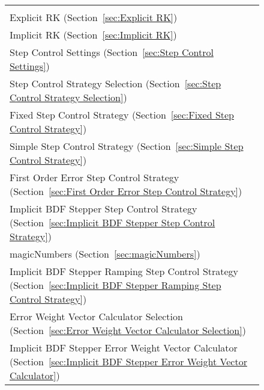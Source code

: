 \begin{figure}
\begin{tabular}{p{}}
    \index{Implicit BDF} \\ 
\hspace*{0.6in} Explicit RK (Section~\ref{sec:Explicit RK})
    \index{Explicit RK} \\ 
\hspace*{0.6in} Implicit RK (Section~\ref{sec:Implicit RK})
    \index{Implicit RK} \\ 
\hspace*{0.4in} Step Control Settings (Section~\ref{sec:Step Control Settings})
    \index{Step Control Settings} \\ 
\hspace*{0.6in} Step Control Strategy Selection (Section~\ref{sec:Step Control Strategy Selection})
    \index{Step Control Strategy Selection} \\ 
\hspace*{0.8in} Fixed Step Control Strategy (Section~\ref{sec:Fixed Step Control Strategy})
    \index{Fixed Step Control Strategy} \\ 
\hspace*{0.8in} Simple Step Control Strategy (Section~\ref{sec:Simple Step Control Strategy})
    \index{Simple Step Control Strategy} \\ 
\hspace*{0.8in} First Order Error Step Control Strategy (Section~\ref{sec:First Order Error Step Control Strategy})
    \index{First Order Error Step Control Strategy} \\ 
\hspace*{0.8in} Implicit BDF Stepper Step Control Strategy (Section~\ref{sec:Implicit BDF Stepper Step Control Strategy})
    \index{Implicit BDF Stepper Step Control Strategy} \\ 
\hspace*{1in} magicNumbers (Section~\ref{sec:magicNumbers})
    \index{magicNumbers} \\ 
\hspace*{0.8in} Implicit BDF Stepper Ramping Step Control Strategy (Section~\ref{sec:Implicit BDF Stepper Ramping Step Control Strategy})
    \index{Implicit BDF Stepper Ramping Step Control Strategy} \\ 
\hspace*{0.6in} Error Weight Vector Calculator Selection (Section~\ref{sec:Error Weight Vector Calculator Selection})
    \index{Error Weight Vector Calculator Selection} \\ 
\hspace*{0.8in} Implicit BDF Stepper Error Weight Vector Calculator (Section~\ref{sec:Implicit BDF Stepper Error Weight Vector Calculator})

\end{tabular}
\end{figure}
